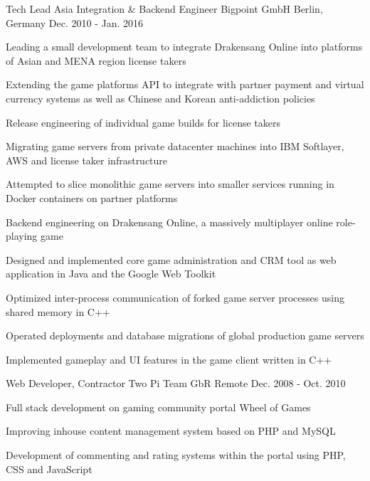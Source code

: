 \begin{cventries}
  \cventry
    {Tech Lead Asia Integration \& Backend Engineer} %
    {Bigpoint GmbH} %
    {Berlin, Germany} %
    {Dec. 2010 - Jan. 2016} %
    {
      \begin{cvitems} %
        \item {Leading a small development team to integrate Drakensang Online into platforms of Asian and MENA region license takers}
        \begin{cvsubitems}
          \item {Extending the game platforms API to integrate with partner payment and virtual currency systems as well as Chinese and Korean anti-addiction policies}
          \item {Release engineering of individual game builds for license takers}
          \item {Migrating game servers from private datacenter machines into IBM Softlayer, AWS and license taker infrastructure}
          \item {Attempted to slice monolithic game servers into smaller services running in Docker containers on partner platforms}
        \end{cvsubitems}
        \item {Backend engineering on Drakensang Online, a massively multiplayer online role-playing game}
        \begin{cvsubitems}
          \item {Designed and implemented core game administration and CRM tool as web application in Java and the Google Web Toolkit}
          \item {Optimized inter-process communication of forked game server processes using shared memory in C++}
          \item {Operated deployments and database migrations of global production game servers}
          \item {Implemented gameplay and UI features in the game client written in C++}
        \end{cvsubitems}
      \end{cvitems}
    }

  \cventry
    {Web Developer, Contractor} %
    {Two Pi Team GbR} %
    {Remote} %
    {Dec. 2008 - Oct. 2010} %
    {
      \begin{cvitems} %
        \item {Full stack development on gaming community portal Wheel of Games}
        \item {Improving inhouse content management system based on PHP and MySQL}
        \item {Development of commenting and rating systems within the portal using PHP, CSS and JavaScript}
      \end{cvitems}
    }

\end{cventries}
